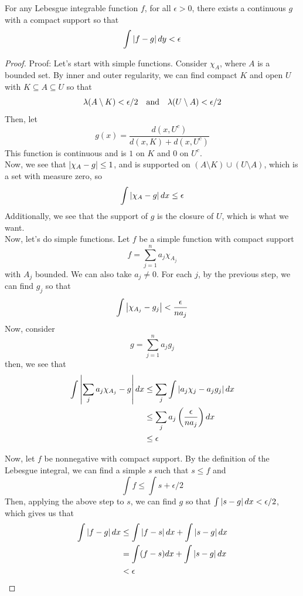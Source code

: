 \begin{lemma}
    For any Lebesgue integrable function $f$, for all $\epsilon > 0$, there exists a continuous $g$ with a compact support so that
    \[ \int \left\lvert {f - g} \right\rvert dy < \epsilon \]
\end{lemma}
\begin{proof}{Proof:}
    Let's start with simple functions. Consider $\chi_{A}$, where $A$ is a bounded set. By inner and outer regularity, we can find compact $K$ and open $U$ with $K \subseteq A \subseteq U$ so that
    \[ \lambda(A \setminus K) < \epsilon/2 \quad \text{and} \quad \lambda(U \setminus A) < \epsilon/2 \]
    Then, let
    \[ g(x) = \frac{d(x, U^{c})}{d(x, K) + d(x, U^{c})} \]
    This function is continuous and is $1$ on $K$ and $0$ on $U^{c}$.\\

    Now, we see that $\left\lvert {\chi_{A} - g} \right\rvert \leq 1$, and is supported on $(A \setminus K) \cup (U \setminus A)$, which is a set with measure zero, so
    \[ \int \left\lvert {\chi_{A} - g} \right\rvert dx \leq \epsilon \]
    Additionally, we see that the support of $g$ is the closure of $U$, which is what we want.\\

    Now, let's do simple functions. Let $f$ be a simple function with compact support
    \[ f = \sum_{j = 1}^{n} a_j\chi_{A_j} \]
    with $A_j$ bounded. We can also take $a_j \ne 0$. For each $j$, by the previous step, we can find $g_j$ so that
    \[ \int \left\lvert {\chi_{A_j} - g_j} \right\rvert < \frac{\epsilon}{na_j} \]
    Now, consider
    \[ g = \sum_{j = 1}^{n} a_jg_j \]
    then, we see that
    \begin{align*}
        \int \left\lvert {\sum_{j} a_j\chi_{A_j} - g} \right\rvert dx &\leq \sum_{j} \int \left\lvert {a_j\chi_{j} - a_jg_j} \right\rvert dx\\
        &\leq \sum_{j} a_j\left(\frac{\epsilon}{na_j}\right)dx\\
        &\leq \epsilon
    \end{align*}

    Now, let $f$ be nonnegative with compact support. By the definition of the Lebesgue integral, we can find a simple $s$ such that $s \leq f$ and
    \[ \int f \leq \int s + \epsilon/2 \]
    Then, applying the above step to $s$, we can find $g$ so that $\int\left\lvert {s - g} \right\rvert dx < \epsilon/2$, which gives us that
    \begin{align*}
        \int \left\lvert {f - g} \right\rvert dx &\leq \int \left\lvert {f - s} \right\rvert dx + \int \left\lvert {s - g} \right\rvert dx\\
        &= \int (f - s)dx + \int \left\lvert {s - g} \right\rvert dx\\
        &< \epsilon 
    \end{align*}


\end{proof}
